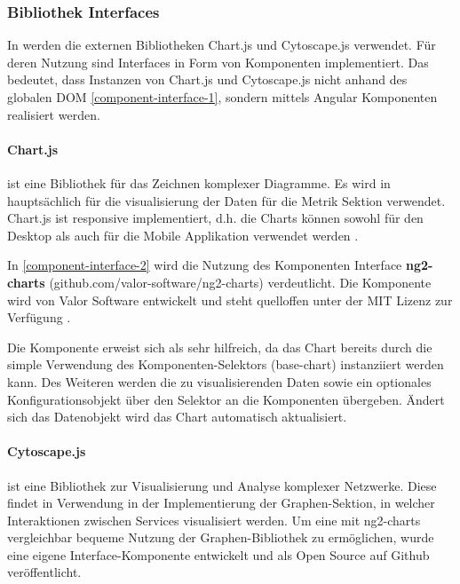 \subsubsection{Bibliothek Interfaces}

In \projectname werden die externen Bibliotheken Chart.js und Cytoscape.js verwendet.
Für deren Nutzung sind Interfaces in Form von Komponenten implementiert.
Das bedeutet, dass Instanzen von Chart.js und Cytoscape.js nicht anhand des globalen \ac{DOM} \ref{component-interface-1},
sondern mittels Angular Komponenten realisiert werden.

\newpage
\paragraph{Chart.js}
ist eine Bibliothek für das Zeichnen komplexer Diagramme.
Es wird in \projectname{} hauptsächlich für die visualisierung der Daten für die Metrik Sektion verwendet.
Chart.js ist responsive implementiert, d.h. die Charts können sowohl für den Desktop
als auch für die Mobile Applikation verwendet werden \cite{Chart80:online}.

\vspace{0.3cm}



\vspace{0.3cm}
In \ref{component-interface-2} wird die Nutzung des Komponenten Interface \textbf{ng2-charts} (github.com/valor-software/ng2-charts) verdeutlicht.
Die Komponente wird von Valor Software entwickelt und steht quelloffen unter der MIT Lizenz zur Verfügung \cite{valor6:online}.

Die Komponente erweist sich als sehr hilfreich, da das Chart bereits durch die simple Verwendung des Komponenten-Selektors (base-chart) instanziiert werden kann.
Des Weiteren werden die zu visualisierenden Daten sowie ein optionales Konfigurationsobjekt über den Selektor an die Komponenten übergeben.
Ändert sich das Datenobjekt wird das Chart automatisch aktualisiert.


\newpage
\paragraph{Cytoscape.js}
ist eine Bibliothek zur Visualisierung und Analyse komplexer Netzwerke.
Diese findet in \projectname{} Verwendung in der Implementierung der Graphen-Sektion,
in welcher Interaktionen zwischen Services visualisiert werden.
Um eine mit ng2-charts vergleichbar bequeme Nutzung der Graphen-Bibliothek zu ermöglichen,
wurde eine eigene Interface-Komponente entwickelt und als Open Source auf Github veröffentlicht.


